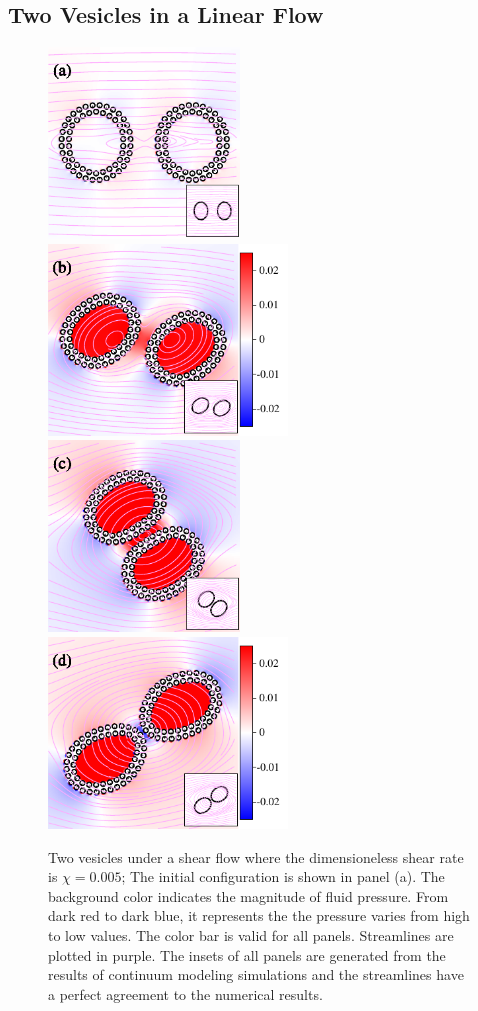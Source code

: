 \documentclass[lineno]{jfm}
\begin{document}
%


\subsection{Two Vesicles in a Linear Flow}


\begin{figure}
\centering
\includegraphics[height=2in]{N116_shear_0.pdf}
\includegraphics[height=2in]{N116_shear_2500.pdf}\\
\includegraphics[height=2in]{N116_shear_5000.pdf}
\includegraphics[height=2in]{N116_shear_7500.pdf}
  \caption{Two vesicles under a shear flow where the dimensioneless shear rate is $\chi=0.005$; The initial configuration is shown in panel (a). The background color indicates the magnitude of fluid pressure. From dark red to dark blue, it represents the the pressure varies from high to low values. The color bar is valid for all panels. Streamlines are plotted in purple. The insets of all panels are generated from the results of continuum modeling simulations and the streamlines have a perfect agreement to the numerical results.
  }
    \label{figure9}
\end{figure}
\end{document}
